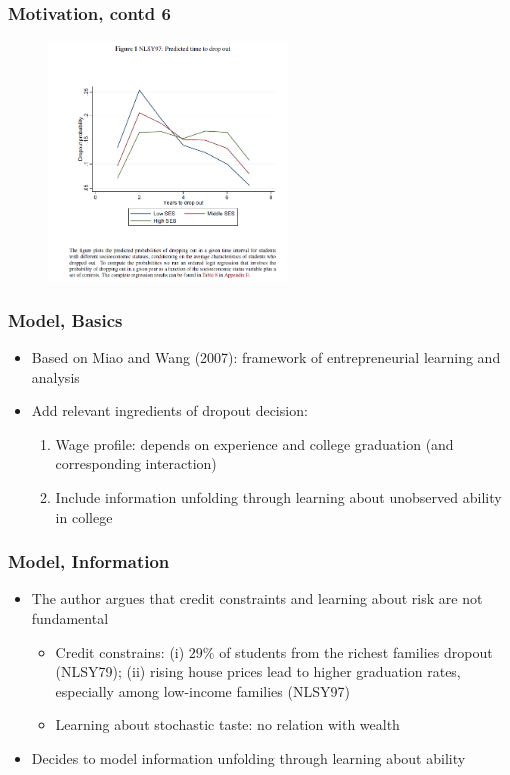 \begin{frame}
	\frametitle{Motivation, contd 6}
		\begin{figure}[H] 
		\caption*{}
		\centering
		\includegraphics[width=2.5in, height=2.5in]{Figures/OT/figure1.png}
		\end{figure}
\end{frame}

\begin{frame}
	\frametitle{Model, Basics}
	\begin{itemize}
		\item Based on Miao and Wang (2007): framework of entrepreneurial learning and analysis
		\item Add relevant ingredients of dropout decision:
			\begin{enumerate}
				\item Wage profile: depends on experience and college graduation (and corresponding interaction)
				\item Include information unfolding through learning about unobserved ability in college
			\end{enumerate}
	\end{itemize}
\end{frame}

\begin{frame}
	\frametitle{Model, Information}
		\begin{itemize}
			\item The author argues that credit constraints and learning about risk are not fundamental
				\begin{itemize}
					\item Credit constrains: (i) $29\%$ of students from the richest families dropout (NLSY79); (ii) rising house prices lead to higher graduation rates, especially among low-income families (NLSY97)
					\item Learning about stochastic taste: no relation with wealth
				\end{itemize}
		\item Decides to model information unfolding through learning about ability
		\end{itemize}
\end{frame}


